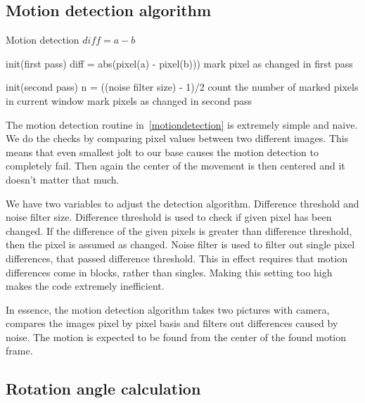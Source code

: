 \documentclass[english,11pt,twoside,a4paper]{article}
\begin{document}
\subsection{Motion detection algorithm}

\begin{algorithm}
  \label{motiondetection}
  \caption{Motion detection $diff = a - b$}
  \begin{algorithmic}
    \STATE {}
    \STATE init(first pass)
      \STATE diff = abs(pixel(a) - pixel(b)))
        \STATE mark pixel as changed in first pass
      \ENDIF
    \ENDFOR

    \STATE {}
    \STATE init(second pass)
    \STATE n = ((noise filter size) - 1)/2
      \STATE count the number of marked pixels in current window
        \STATE mark pixels as changed in second pass
      \ENDIF
    \ENDFOR

  \end{algorithmic}
\end{algorithm}

The motion detection routine in~\ref{motiondetection} is extremely simple and naive. We do the checks by comparing pixel values between two different images. This means that even smallest jolt to our base causes the motion detection to completely fail. Then again the center of the movement is then centered and it doesn't matter that much.

We have two variables to adjust the detection algorithm. Difference threshold and noise filter size. Difference threshold is used to check if given pixel has been changed. If the difference of the given pixels is greater than difference threshold, then the pixel is assumed as changed. Noise filter is used to filter out single pixel differences, that passed difference threshold. This in effect requires that motion differences come in blocks, rather than singles. Making this setting too high makes the code extremely inefficient.

In essence, the motion detection algorithm takes two pictures with camera, compares the images pixel by pixel basis and filters out differences caused by noise. The motion is expected to be found from the center of the found motion frame.

\subsection {Rotation angle calculation}
\end{document}
